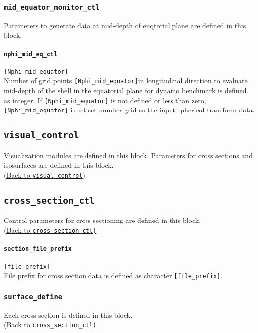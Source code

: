 \subsubsection{\tt mid\_equator\_monitor\_ctl}
\label{href_t:mid_equator_monitor_ctl}
Parameters to generate data at mid-depth of euqtorial plane are defined in this block.

\paragraph{\tt nphi\_mid\_eq\_ctl}
\label{href_t:nphi_mid_eq_ctl}
\verb|[Nphi_mid_equator]| \\
Number of grid points \verb|[Nphi_mid_equator]|in longitudinal direction to evaluate mid-depth of the shell in the equatorial plane for dynamo benchmark is defined as integer. If \verb|[Nphi_mid_equator]| is not defined or less than zero, \verb|[Nphi_mid_equator]| is set set number grid as the input spherical transform data. 


%
%
\subsection{\tt visual\_control}
\label{href_t:visual_control}
Visualization modules are defined in this block. Parameters for cross sections and isosurfaces are defined in this block. \\
\hyperref[href_i:visual_control]{(Back to {\tt visual\_control})}

%
%
\subsection{\tt cross\_section\_ctl}
\label{href_t:cross_section_ctl}
Control parameters for cross sectioning are defined in this block. \\
\hyperref[href_i:cross_section_ctl]{(Back to {\tt cross\_section\_ctl)}}

\paragraph{\tt section\_file\_prefix}
\label{href_t:section_file_prefix}
\verb|[file_prefix]| \\
File prefix for cross section data is defined as character \verb|[file_prefix]|.

\subsubsection{\tt surface\_define}
\label{href_t:surface_define}
Each cross section is defined in this block. \\
\hyperref[href_i:cross_section_ctl]{(Back to {\tt cross\_section\_ctl)}} \\

